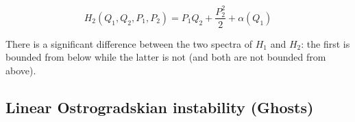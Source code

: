 \begin{equation} \label{eq: second-order_motion_eq_ham}
  H_2(Q_1, Q_2, P_1, P_2) = P_1Q_2 + \frac{P_2^2}{2} + \alpha(Q_1)
\end{equation}

There is a significant difference between the two spectra of $H_1$ and $H_2$:
the first is bounded from below while the latter is not (and both are not
bounded from above).

\subsection{Linear Ostrogradskian instability (Ghosts)}
